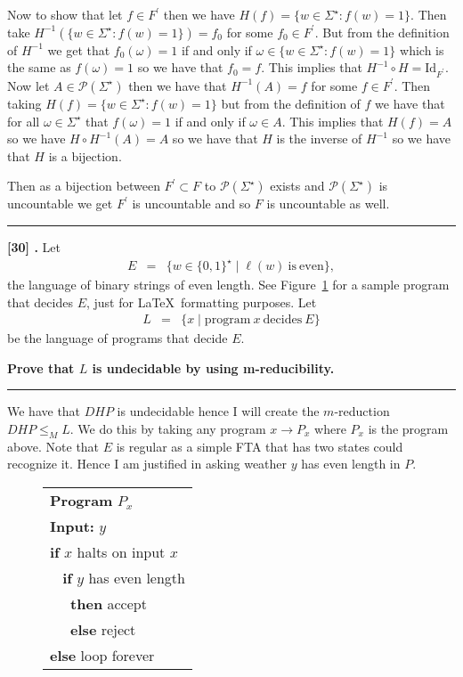 \documentclass[11pt,twoside]{article}
\newcounter{problem}
\newcommand{\problem}[1]{%
\refstepcounter{problem}\noindent\textbf{[#1] \arabic{problem}.}}
\newcommand{\solution}{\bigskip\hrule\bigskip}
\newcommand{\problembreak}{\bigskip\hrule\bigskip}
\begin{document}
Now to show that let $f\in F^\prime$ then we have $H(f)=\{w\in \Sigma^\star: f(w)=1\}$. Then take $H^{-1}(\{w\in \Sigma^\star: f(w)=1\})=f_0$ for some $f_0\in F^\prime$. But from the definition of $H^{-1}$ we get that $f_0(\omega)=1$ if and only if $\omega \in \{w\in \Sigma^\star: f(w)=1\}$ which is the same as $f(\omega)=1$ so we have that $f_0=f$. This implies that $H^{-1}\circ H=\text{Id}_{F^\prime}$. Now let $A\in \mathcal P(\Sigma^\star)$ then we have that $H^{-1}(A)=f$ for some $f\in F^\prime$. Then taking $H(f)=\{w\in \Sigma ^\star: f(w)=1\}$ but from the definition of $f$ we have that for all $\omega \in \Sigma^\star$ that $f(\omega)=1$ if and only if $\omega \in A$. This implies that $H(f)=A$ so we have $H\circ H^{-1}(A)=A$ so we have that $H$ is the inverse of $H^{-1}$ so we have that $H$ is a bijection. 

Then as a bijection between $F^\prime\subset F$ to $\mathcal{P}(\Sigma^\star)$ exists and $\mathcal{P}(\Sigma^\star)$ is uncountable we get $F^\prime$ is uncountable and so $F$ is uncountable as well.



\problembreak

\problem{30}
Let
\begin{eqnarray*}
E
& = &
\{w\in\{0,1\}^\star\mid \ell(w) \mathrm{\ is\ even}\},
\end{eqnarray*}
the language of binary strings of even length.
See Figure~\ref{figure:sampleprogram}
for a sample program that decides $E$,
just for \LaTeX\ formatting purposes.
Let
\begin{eqnarray*}
L
& = &
\{x\mid \mathrm{program\ } x \mathrm{\ decides\ } E\}
\end{eqnarray*}
be the language of programs that decide $E$.

{\bfseries
Prove that $L$ is undecidable by using m-reducibility.
}

\solution

We have that $DHP$ is undecidable hence I will create the $m$-reduction $DHP\leq_M L$. We do this by taking any program $x\to P_x$ where $P_x$ is the program above. Note that $E$ is regular as a simple FTA that has two states could recognize it. Hence I am justified in asking weather $y$ has even length in $P$.

\begin{figure}[tp]
    \begin{tabular}{|l|}
    \hline
    \textbf{Program} $P_x$ \\
    \textbf{Input:} $y$ \\
    \textbf{if} $x$ halts on input $x$ \\
    $\;\;$ \textbf{       if} $y$ has even length 
     \\
    $\;\;\;\;$ \textbf{       then} accept \\
     $\;\;\;\;$ \textbf{       else} reject \\
    \textbf{else} loop forever \\
    \hline
    \end{tabular}
    \label{figure:sampleprogram}
\end{figure}
\end{document}
